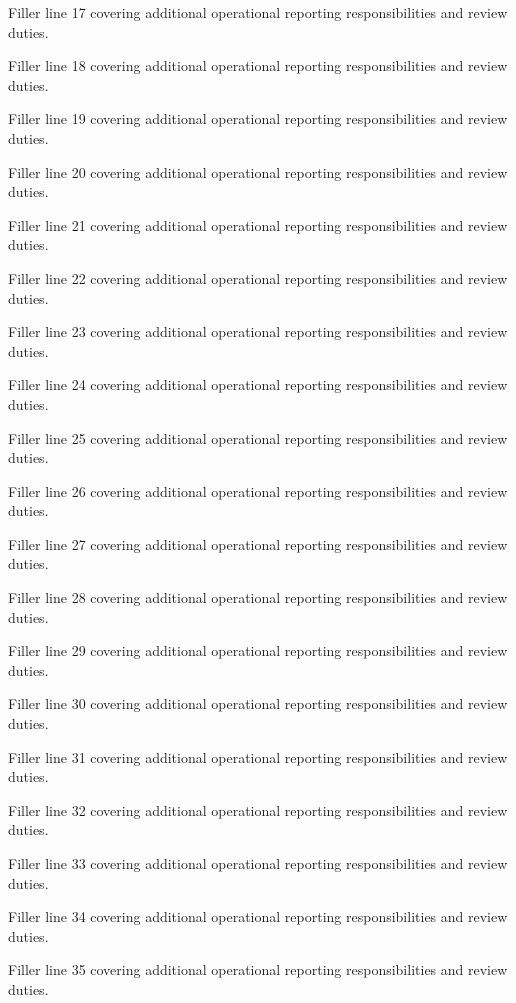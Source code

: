 \documentclass[fontsize=11pt, margin=narrow, medium=print]{careerdossier-cv}
\begin{document}
\begin{CDossierEntry}[title = {Modernization Program}, organization = {Continental Reliability Consortium}, location = {Ottawa, ON}, dates = {2019--Present}]
\begin{CDossierItemize}
    \item Filler line 17 covering additional operational reporting responsibilities and review duties.
    \item Filler line 18 covering additional operational reporting responsibilities and review duties.
    \item Filler line 19 covering additional operational reporting responsibilities and review duties.
    \item Filler line 20 covering additional operational reporting responsibilities and review duties.
    \item Filler line 21 covering additional operational reporting responsibilities and review duties.
    \item Filler line 22 covering additional operational reporting responsibilities and review duties.
    \item Filler line 23 covering additional operational reporting responsibilities and review duties.
    \item Filler line 24 covering additional operational reporting responsibilities and review duties.
    \item Filler line 25 covering additional operational reporting responsibilities and review duties.
    \item Filler line 26 covering additional operational reporting responsibilities and review duties.
    \item Filler line 27 covering additional operational reporting responsibilities and review duties.
    \item Filler line 28 covering additional operational reporting responsibilities and review duties.
    \item Filler line 29 covering additional operational reporting responsibilities and review duties.
    \item Filler line 30 covering additional operational reporting responsibilities and review duties.
    \item Filler line 31 covering additional operational reporting responsibilities and review duties.
    \item Filler line 32 covering additional operational reporting responsibilities and review duties.
    \item Filler line 33 covering additional operational reporting responsibilities and review duties.
    \item Filler line 34 covering additional operational reporting responsibilities and review duties.
    \item Filler line 35 covering additional operational reporting responsibilities and review duties.

\end{CDossierItemize}
\end{CDossierEntry}
\end{document}
